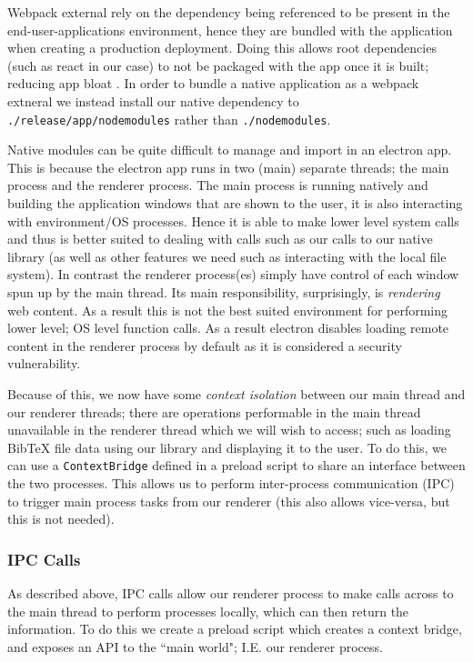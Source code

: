 \documentclass[a4paper,11pt]{article}
\newcommand{\code}[1]{\colorbox{codegray}{\texttt{#1}}}
\begin{document}
Webpack external rely on the dependency being referenced to be present in the end-user-applications environment, hence they are bundled with the application when creating a production deployment. Doing this allows root dependencies (such as react in our case) to not be packaged with the app once it is built; reducing app bloat \cite{electronReactBoilerPlate}. In order to bundle a native application as a webpack extneral we instead install our native dependency to \code{./release/app/node\textunderscore modules} rather than \code{./node\textunderscore modules}.

Native modules can be quite difficult to manage and import in an electron app. This is because the electron app runs in two (main) separate threads; the main process and the renderer process. The main process is running natively and building the application windows that are shown to the user, it is also interacting with environment/OS processes. Hence it is able to make lower level system calls and thus is better suited to dealing with calls such as our calls to our native library (as well as other features we need such as interacting with the local file system). In contrast the renderer process(es) simply have control of each window spun up by the main thread. Its main responsibility, surprisingly, is \textit{rendering} web content. As a result this is not the best suited environment for performing lower level; OS level function calls. As a result electron disables loading remote content in the renderer process by default as it is considered a security vulnerability.

Because of this, we now have some \textit{context isolation} between our main thread and our renderer threads; there are operations performable in the main thread unavailable in the renderer thread which we will wish to access; such as loading BibTeX file data using our library and displaying it to the user. To do this, we can use a \code{ContextBridge} defined in a preload script to share an interface between the two processes. This allows us to perform inter-process communication (IPC) to trigger main process tasks from our renderer (this also allows vice-versa, but this is not needed).

\subsubsection{IPC Calls}
As described above, IPC calls allow our renderer process to make calls across to the main thread to perform processes locally, which can then return the information. To do this we create a preload script which creates a context bridge, and exposes an API to the ``main world"; I.E. our renderer process.
\end{document}
